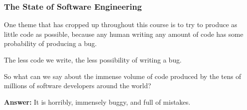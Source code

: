 \documentclass[aspectratio=169, handout]{beamer}
\begin{document}
\begin{frame}[fragile]
  \frametitle{The State of Software Engineering}

  One theme that has cropped up throughout this course is to try
  to produce as little code as possible, because any human writing any
  amount of code has some probability of producing a bug.

  \pause
  \vspace{\fill}

  The less code we write, the less possibility of writing a bug.

  \pause
  \vspace{\fill}

  So what can we say about the immense volume of code produced by
  the tens of millions of software developers around the world?

  \pause
  \vspace{\fill}

  \textbf{Answer:} It is horribly, immensely buggy, and full of mistakes.
\end{frame}
\end{document}
